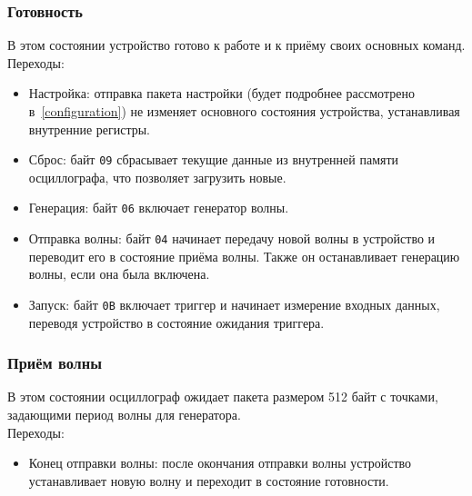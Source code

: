 \documentclass[a4paper,12pt]{report}
\numberwithin{equation}{section}
\begin{document}
\subsubsection{Готовность} \label{ostate:ready}
В этом состоянии устройство готово к работе и к приёму своих основных команд. \\
Переходы:
\begin{itemize}
\item Настройка: отправка пакета настройки (будет подробнее рассмотрено
  в~\ref{configuration}) не изменяет основного состояния устройства,
  устанавливая внутренние регистры.
\item Сброс: байт \texttt{09} сбрасывает текущие данные из внутренней памяти
  осциллографа, что позволяет загрузить новые.
\item Генерация: байт \texttt{06} включает генератор волны.
\item Отправка волны: байт \texttt{04} начинает передачу новой волны в
  устройство и переводит его в состояние приёма волны. Также он останавливает
  генерацию волны, если она была включена.
\item Запуск: байт \texttt{0B} включает триггер и начинает измерение входных
  данных, переводя устройство в состояние ожидания триггера.
\end{itemize}

\subsubsection{Приём волны} \label{ostate:wave}
В этом состоянии осциллограф ожидает пакета размером 512 байт с точками,
задающими период волны для генератора. \\
Переходы:
\begin{itemize}
\item Конец отправки волны: после окончания отправки волны устройство
  устанавливает новую волну и переходит в состояние готовности.
\end{itemize}
\end{document}
